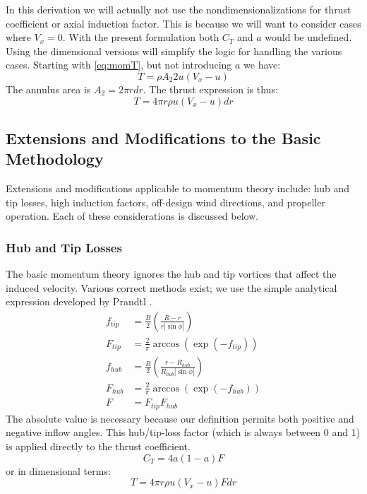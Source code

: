 \documentclass{article}
\begin{document}
In this derivation we will actually not use the nondimensionalizations for thrust coefficient or axial induction factor.  This is because we will want to consider cases where $V_x = 0$.  With the present formulation both $C_T$ and $a$ would be undefined.  Using the dimensional versions will simplify the logic for handling the various cases.  Starting with \cref{eq:momT}, but not introducing $a$ we have:
\begin{equation}
    T = \rho A_2 2 u (V_x - u)
\end{equation}
The annulus area is $A_2 = 2 \pi r dr$.  The thrust expression is thus:
\begin{equation}
T = 4 \pi r \rho u (V_x - u) dr
\label{eq:Tmom}
\end{equation}

\subsection{Extensions and Modifications to the Basic Methodology}

Extensions and modifications applicable to momentum theory include: hub and tip losses, high induction factors, off-design wind directions, and propeller operation.  Each of these considerations is discussed below.

\subsubsection{Hub and Tip Losses}

The basic momentum theory ignores the hub and tip vortices that affect the induced velocity.  Various correct methods exist; we use the simple analytical expression developed by Prandtl \cite{Glauert1935}.
\begin{equation}
    \begin{aligned}
    f_{tip} &= \frac{B}{2} \left(\frac{R - r}{r|\sin\phi|} \right)\\
    F_{tip} &= \frac{2}{\pi} \arccos(\exp(-f_{tip}))\\
    f_{hub} &= \frac{B}{2} \left(\frac{r - R_{hub}}{R_{hub}|\sin\phi|} \right)\\
    F_{hub} &= \frac{2}{\pi} \arccos(\exp(-f_{hub}))\\
    F &= F_{tip}F_{hub}
    \end{aligned}
\end{equation}
The absolute value is necessary because our definition permits both positive and negative inflow angles.  This hub/tip-loss factor (which is always between 0 and 1) is applied directly to the thrust coefficient.
\begin{equation}
    C_T = 4 a (1 - a) F
    \label{eq:CTmom2}
\end{equation}
or in dimensional terms:
\begin{equation}
    T = 4 \pi r \rho u (V_x - u) F dr
    \label{eq:Tmom2}
\end{equation}
\end{document}
